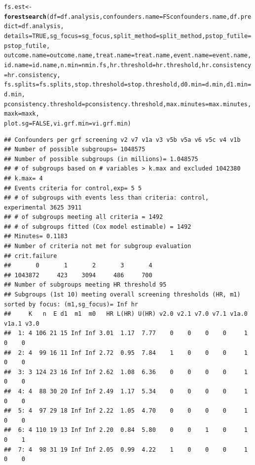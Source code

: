 \documentclass[9pt]{article}\usepackage[]{graphicx}\usepackage[]{xcolor}
\makeatletter
\newcommand{\hlnum}[1]{\textcolor[rgb]{0.686,0.059,0.569}{#1}}%
\newcommand{\hlstd}[1]{\textcolor[rgb]{0.345,0.345,0.345}{#1}}%
\newcommand{\hlkwb}[1]{\textcolor[rgb]{0.69,0.353,0.396}{#1}}%
\newcommand{\hlkwc}[1]{\textcolor[rgb]{0.333,0.667,0.333}{#1}}%
\newcommand{\hlkwd}[1]{\textcolor[rgb]{0.737,0.353,0.396}{\textbf{#1}}}%
\newenvironment{kframe}{%
 \def\at@end@of@kframe{}%
 \ifinner\ifhmode%
  \def\at@end@of@kframe{\end{minipage}}%
  \begin{minipage}{\columnwidth}%
 \fi\fi%
 \def\FrameCommand##1{\hskip\@totalleftmargin \hskip-\fboxsep
 \colorbox{shadecolor}{##1}\hskip-\fboxsep
     \hskip-\linewidth \hskip-\@totalleftmargin \hskip\columnwidth}%
 \MakeFramed {\advance\hsize-\width
   \@totalleftmargin\z@ \linewidth\hsize
   \@setminipage}}%
 {\par\unskip\endMakeFramed%
 \at@end@of@kframe}
\newenvironment{knitrout}{}{} %
\theoremstyle{definition}
\theoremstyle{remark}
\makeatother
\begin{document}
\begin{knitrout}
\begin{kframe}
\begin{alltt}
\hlstd{fs.est} \hlkwb{<-} \hlkwd{forestsearch}\hlstd{(}\hlkwc{df} \hlstd{= df.analysis,} \hlkwc{confounders.name} \hlstd{= FSconfounders.name,} \hlkwc{df.predict} \hlstd{= df.analysis,}
    \hlkwc{details} \hlstd{=} \hlnum{TRUE}\hlstd{,} \hlkwc{sg_focus} \hlstd{= sg_focus,} \hlkwc{split_method} \hlstd{= split_method,} \hlkwc{pstop_futile} \hlstd{= pstop_futile,}
    \hlkwc{outcome.name} \hlstd{= outcome.name,} \hlkwc{treat.name} \hlstd{= treat.name,} \hlkwc{event.name} \hlstd{= event.name,}
    \hlkwc{id.name} \hlstd{= id.name,} \hlkwc{n.min} \hlstd{= nmin.fs,} \hlkwc{hr.threshold} \hlstd{= hr.threshold,} \hlkwc{hr.consistency} \hlstd{= hr.consistency,}
    \hlkwc{fs.splits} \hlstd{= fs.splits,} \hlkwc{stop.threshold} \hlstd{= stop.threshold,} \hlkwc{d0.min} \hlstd{= d.min,} \hlkwc{d1.min} \hlstd{= d.min,}
    \hlkwc{pconsistency.threshold} \hlstd{= pconsistency.threshold,} \hlkwc{max.minutes} \hlstd{= max.minutes,} \hlkwc{maxk} \hlstd{= maxk,}
    \hlkwc{plot.sg} \hlstd{=} \hlnum{FALSE}\hlstd{,} \hlkwc{vi.grf.min} \hlstd{= vi.grf.min)}
\end{alltt}
\begin{verbatim}
## Confounders per grf screening v2 v7 v1a v3 v5b v5a v6 v5c v4 v1b 
## Number of possible subgroups= 1048575 
## Number of possible subgroups (in millions)= 1.048575 
## # of subgroups based on # variables > k.max and excluded 1042380 
## k.max= 4 
## Events criteria for control,exp= 5 5 
## # of subgroups with events less than criteria: control, experimental 3625 3911 
## # of subgroups meeting all criteria = 1492 
## # of subgroups fitted (Cox model estimable) = 1492 
## Minutes= 0.1183 
## Number of criteria not met for subgroup evaluation 
## crit.failure
##       0       1       2       3       4 
## 1043872     423    3094     486     700 
## Number of subgroups meeting HR threshold 95 
## Subgroups (1st 10) meeting overall screening thresholds (HR, m1) sorted by focus: (m1,sg_focus)= Inf hr 
##     K   n  E d1  m1  m0   HR L(HR) U(HR) v2.0 v2.1 v7.0 v7.1 v1a.0 v1a.1 v3.0
##  1: 4 106 21 15 Inf Inf 3.01  1.17  7.77    0    0    0    0     1     0    0
##  2: 4  99 16 11 Inf Inf 2.72  0.95  7.84    1    0    0    0     1     0    0
##  3: 3 124 23 16 Inf Inf 2.62  1.08  6.36    0    0    0    0     1     0    0
##  4: 4  88 30 20 Inf Inf 2.49  1.17  5.34    0    0    0    0     1     0    0
##  5: 4  97 29 18 Inf Inf 2.22  1.05  4.70    0    0    0    0     1     0    0
##  6: 4 110 19 13 Inf Inf 2.20  0.84  5.80    0    0    1    0     1     0    1
##  7: 4  98 31 19 Inf Inf 2.05  0.99  4.22    1    0    0    0     1     0    0

\end{verbatim}
\end{kframe}
\end{knitrout}
\end{document}
